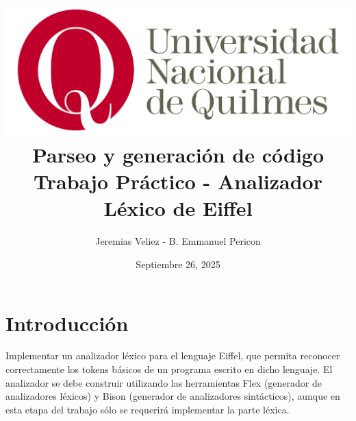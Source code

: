\documentclass[a4paper,12pt]{article}
\title{ 
        \includegraphics[scale=1.3]{logo-UNQ}\\ 
        \vspace{4mm}
        \huge{Parseo y generación de código  \\ 
        \vspace{4mm} 
        Trabajo Práctico - Analizador Léxico de Eiffel} }
\author{Jeremias Veliez - B. Emmanuel Pericon}
\date{Septiembre 26, 2025}
\begin{document}
\maketitle

\tableofcontents

\newpage

\section{Introducción}

\vspace{4mm}
Implementar un analizador léxico para el lenguaje Eiffel, que permita reconocer
correctamente los tokens básicos de un programa escrito en dicho lenguaje. 
El analizador se debe construir utilizando las herramientas Flex (generador de analizadores
léxicos) y Bison (generador de analizadores sintácticos), aunque en esta etapa del trabajo
sólo se requerirá implementar la parte léxica.
\end{document}
